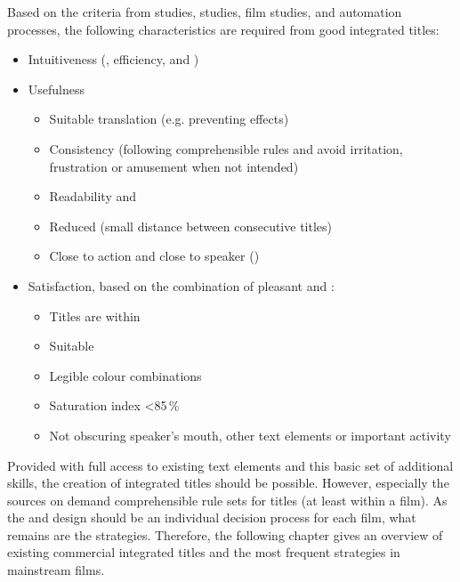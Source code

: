 Based on the criteria from  studies,  studies, film studies, and automation processes, the following characteristics are required from good integrated titles:

\sloppy
\begin{itemize}
\item Intuitiveness (, efficiency, and )
\item Usefulness 
  \begin{itemize}
  \item Suitable translation (e.g. preventing  effects)
  \item Consistency (following comprehensible rules and avoid irritation, frustration or amusement when not intended)
  \item Readability and 
  \item Reduced  (small distance between consecutive titles)
  \item Close to action and close to speaker ()
  \end{itemize}
\item Satisfaction, based on the combination of pleasant  and : 
  \begin{itemize}
  \item Titles are within 
  \item Suitable 
  \item Legible colour combinations
  \item Saturation index <85\,\%
  \item Not obscuring speaker’s mouth, other text elements or important activity
  \end{itemize}
\end{itemize}
\fussy 

Provided with full access to existing text elements and this basic set of additional skills, the creation of integrated titles should be possible. However, especially the sources on  demand comprehensible rule sets for titles (at least within a film). As the  and design should be an individual decision process for each film, what remains are the  strategies. Therefore, the following chapter gives an overview of existing commercial integrated titles and the most frequent  strategies in mainstream films.


